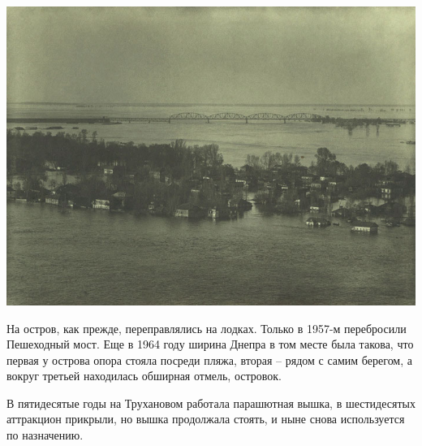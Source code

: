 \begin{center}
\includegraphics[width=\linewidth]{chast-gorodki/cherto/tru05.jpg}
\end{center}

На остров, как прежде, переправлялись на лодках. Только в 1957-м перебросили Пешеходный мост. Еще в 1964 году ширина Днепра в том месте была такова, что первая у острова опора стояла посреди пляжа, вторая – рядом с самим берегом, а вокруг третьей находилась обширная отмель, островок.

В пятидесятые годы на Трухановом работала парашютная вышка, в шестидесятых аттракцион прикрыли, но вышка продолжала стоять, и ныне снова используется по назначению.

